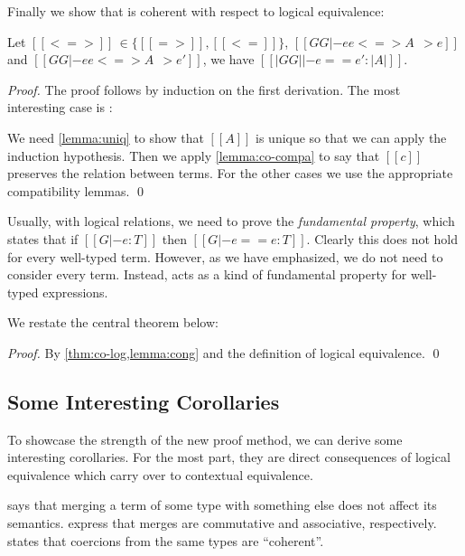 Finally we show that \name is coherent with respect to logical equivalence:

\begin{lemma}  \label{thm:co-log} \leavevmode
  Let $ [[<=>]] \, \in \{ [[=>]] , [[<=]] \}$, $[[GG |- ee <=> A ~~> e]]$ and
  $[[GG |- ee <=> A ~~> e']]$, we have $[[|GG| |- e == e' : |A| ]]$.
\end{lemma}
\begin{proof}
  The proof follows by induction on the first derivation. The most interesting case is :
  \begin{mathpar}
  \end{mathpar}
  We need \cref{lemma:uniq} to show that $[[A]]$ is unique so that we can
  apply the induction hypothesis. Then we apply \cref{lemma:co-compa} to say
  that $[[c]]$ preserves the relation between terms. For the other cases
  we use the appropriate compatibility lemmas. \qed
\end{proof}

\begin{remark}
  Usually, with logical relations, we need to prove the \textit{fundamental
    property}, which states that if $[[G |- e : T]]$ then $[[G |- e == e : T]]$.
  Clearly this does not hold for every well-typed \tname term. However, as we
  have emphasized, we do not need to consider every \tname term. Instead, 
  acts as a kind of fundamental property for
  well-typed \name expressions.
\end{remark}

We restate the central theorem below:
\coherence*
\begin{proof}
  By \cref{thm:co-log,lemma:cong} and the definition of logical equivalence.
  \qed
\end{proof}

\subsection{Some Interesting Corollaries}

To showcase the strength of the new proof method, we can derive some
interesting corollaries. For the most part, they are direct consequences of
logical equivalence which carry over to contextual equivalence.


 says that merging a term of some type with something else
does not affect its semantics.  express that
merges are commutative and associative, respectively. 
states that coercions from the same types are ``coherent''.

